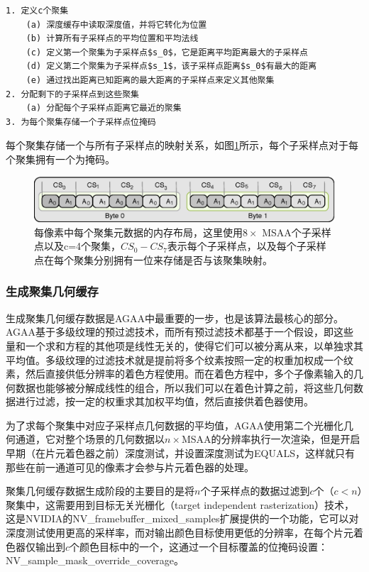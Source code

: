\begin{lstlisting}[mathescape=true]
1. 定义c个聚集
	(a) 深度缓存中读取深度值，并将它转化为位置
	(b) 计算所有子采样点的平均位置和平均法线
	(c) 定义第一个聚集为子采样点$s_0$，它是距离平均距离最大的子采样点
	(d) 定义第二个聚集为子采样点$s_1$，该子采样点距离$s_0$有最大的距离
	(e) 通过找出距离已知距离的最大距离的子采样点来定义其他聚集
2. 分配剩下的子采样点到这些聚集
	(a) 分配每个子采样点距离它最近的聚集
3. 为每个聚集存储一个子采样点位掩码
\end{lstlisting}

每个聚集存储一个与所有子采样点的映射关系，如图\ref{f:shade-aggregate-mask}所示，每个子采样点对于每个聚集拥有一个为掩码。

\begin{figure}
	\includegraphics[width=\textwidth]{figures/shade/aggregate-mask}
	\caption{每像素中每个聚集元数据的内存布局，这里使用$8\times$ MSAA个子采样点以及c=4个聚集，$CS_0-CS_7$表示每个子采样点，以及每个子采样点在每个聚集分别拥有一位来存储是否与该聚集映射。}
	\label{f:shade-aggregate-mask}
\end{figure}




\subsubsection{生成聚集几何缓存}
生成聚集几何缓存数据是AGAA中最重要的一步，也是该算法最核心的部分。AGAA基于多级纹理的预过滤技术，而所有预过滤技术都基于一个假设，即这些量和一个求和方程的其他项是线性无关的，使得它们可以被分离从来，以单独求其平均值。多级纹理的过滤技术就是提前将多个纹素按照一定的权重加权成一个纹素，然后直接供低分辨率的着色方程使用。而在着色方程中，多个子像素输入的几何数据也能够被分解成线性的组合，所以我们可以在着色计算之前，将这些几何数据进行过滤，按一定的权重求其加权平均值，然后直接供着色器使用。

为了求每个聚集中对应子采样点几何数据的平均值，AGAA使用第二个光栅化几何通道，它对整个场景的几何数据以$n\times$MSAA的分辨率执行一次渲染，但是开启早期（在片元着色器之前）深度测试，并设置深度测试为EQUALS，这样就只有那些在前一通道可见的像素才会参与片元着色器的处理。

聚集几何缓存数据生成阶段的主要目的是将$n$个子采样点的数据过滤到$c$个（$c<n$）聚集中，这需要用到目标无关光栅化（target independent rasterization）技术，这是NVIDIA的NV\_framebuffer\_mixed\_samples扩展\cite{a:NVIDIAOpenGLExtensionsSpecifications}提供的一个功能，它可以对深度测试使用更高的采样率，而对输出颜色目标使用更低的分辨率，在每个片元着色器仅输出到$c$个颜色目标中的一个，这通过一个目标覆盖的位掩码设置：NV\_sample\_mask\_override\_coverage。

